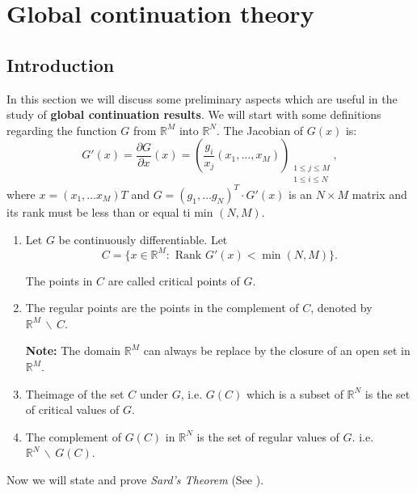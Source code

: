 \chapter{Global continuation theory}\label{chap3} %

\section{Introduction}\pageoriginale\label{chap3-sec3.1}%

 In this section we will discuss some preliminary aspects which are
  useful  in the study of {\bf global continuation results}. We will start
  with some definitions regarding the function $G$ from $\mathbb{R}^M$
  into $\mathbb{R}^N$.    
  The Jacobian of $G(x)$ is:
  $$
  G' (x) = \frac{\partial G}{\partial x} (x) = ( \frac{g_i}{x_j} (x_1, 
  \ldots , x_M))_{\substack{1 \leq j \leq M\\ 1 \leq i \leq N}}, 
  $$
  where $x=(x_1, \ldots x_M)T$ and $G=(g_1, \ldots g_N)^T \cdot G'(x)$ is
  an $N \times M$ matrix and its rank must be less than or equal ti
  min $(N, M)$.

\begin{defins*} 
\begin{enumerate}
\renewcommand{\labelenumi}{(\theenumi)}
\item Let $G$ be continuously differentiable. Let 
$$
C =  \{ x \in  \mathbb{R}^M : \text{ Rank } G' (x) < \min (N,M)\}.
$$ 

The points in $C$ are called critical points of $G$. 

\item The regular points are the points in the complement  of $C$,
  denoted by $\mathbb{R}^M \, \backslash \, C$. 

\medskip
\noindent\textbf{Note:}
The domain $\mathbb{R}^M$ can always be replace by the
closure of an open set in $\mathbb{R}^M$. 

\item The\pageoriginale image  of the set $C$ under $G$, i.e. $G(C)$
  which is a subset 
  of $\mathbb{R}^N$ is the set of critical values of $G$. 

\item The complement of $G(C)$ in $\mathbb{R}^N$ is the set of regular
  values of $G$. i.e. $\mathbb{R}^N \, \backslash \, G(C)$. 
\end{enumerate}
\end{defins*}

Now we will state and prove {\em Sard's Theorem} (See \cite{key26}). 

